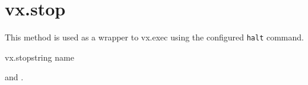 \rpcnoerrors


\section{vx.stop}

This method is used as a wrapper to vx.exec using the configured \texttt{halt}
command.

\begin{rpcsynopsis}{vx.stop}{string name}
\end{rpcsynopsis}

\begin{rpcaccess}
 and \rpcownerchecks.
\end{rpcaccess}


\begin{rpcerrors}
\end{rpcerrors}
